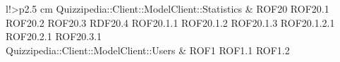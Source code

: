 \begin{tabella}{l!{\VRule}>{\centering\arraybackslash}p{2.5 cm}}
Quizzipedia::Client::ModelClient::Statistics & ROF20 \linebreak ROF20.1 \linebreak ROF20.2 \linebreak ROF20.3 \linebreak RDF20.4 \linebreak ROF20.1.1 \linebreak ROF20.1.2 \linebreak ROF20.1.3 \linebreak ROF20.1.2.1 \linebreak ROF20.2.1 \linebreak ROF20.3.1 \\
Quizzipedia::Client::ModelClient::Users & ROF1 \linebreak ROF1.1 \linebreak ROF1.2 \linebre
\end{tabella}
